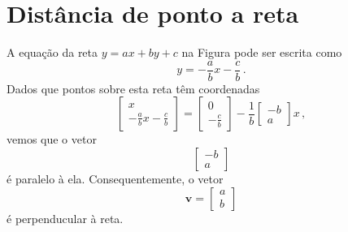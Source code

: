 %
%
%

\section{Distância de ponto a reta} \label{sse:point2line}
A equação da reta $y=ax+by+c$ na Figura pode ser escrita como
\begin{equation*}
y=-\frac{a}{b}x-\frac{c}{b}\,.
\end{equation*}
Dados que pontos sobre esta reta têm coordenadas
\begin{equation*}
\left[ \begin{array}{c} x \\ -\frac{a}{b}x-\frac{c}{b} \end{array} \right] =
\left[ \begin{array}{c} 0 \\ -\frac{c}{b} \end{array} \right] -\frac{1}{b}
\left[ \begin{array}{c} -b \\ a \end{array} \right]x\,,
\end{equation*}
vemos que o vetor
\begin{equation*}
\left[ \begin{array}{c} -b \\ a \end{array} \right]
\end{equation*}
é paralelo à ela. Consequentemente, o vetor
\begin{equation*}
\textbf{v}=\left[ \begin{array}{c} a\\ b \end{array} \right]
\end{equation*}
é perpenducular à reta.


